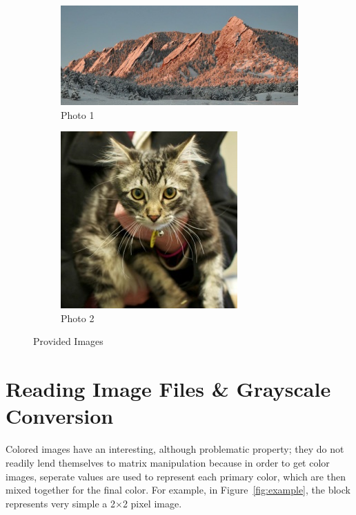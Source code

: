 \documentclass[10pt]{report}
\begin{document}
    \begin{figure}[ht]
        \centering
        \begin{subfigure}{\textwidth}
            \centering
            \includegraphics[scale=0.7]{./img/photo1.png}
            \caption{Photo 1}
            \label{fig:p1}
        \end{subfigure}
        \begin{subfigure}{\textwidth}
            \centering
            \includegraphics[scale=0.7]{./img/photo2.png}
            \caption{Photo 2}
            \label{fig:p2}
        \end{subfigure}
        \caption{Provided Images}
        \label{fig:init_image}
    \end{figure}

\section{Reading Image Files \& Grayscale Conversion}

Colored images have an interesting, although problematic property; they do not readily lend themselves to matrix manipulation because in order to get color images, seperate values are used to represent each primary color, which are then mixed together for the final color.  For example, in Figure~\ref{fig:example}, the block represents very simple a 2$\times$2 pixel image.
\end{document}
